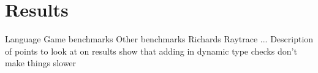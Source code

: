\section{Results}
\label{sec:results}

\begin{outline}

\1 Language Game benchmarks
\1 Other benchmarks
    \2 Richards
    \2 Raytrace
    \2 ...
\1 Description of points to look at on results
    \2 show that adding in dynamic type checks don't make things slower


\end{outline}